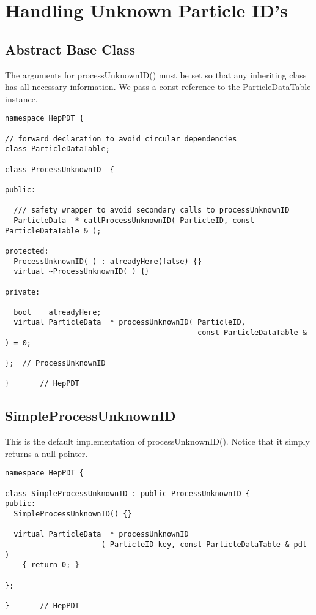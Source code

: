 \section { Handling Unknown Particle ID's }
\label{unknownID}

\subsection { Abstract Base Class }

The arguments for processUnknownID() must be set so that any
inheriting class has all necessary information. 
We pass a const reference to the ParticleDataTable instance.  

\begin{verbatim}
namespace HepPDT {

// forward declaration to avoid circular dependencies
class ParticleDataTable;

class ProcessUnknownID  {

public:

  /// safety wrapper to avoid secondary calls to processUnknownID
  ParticleData  * callProcessUnknownID( ParticleID, const ParticleDataTable & );

protected:
  ProcessUnknownID( ) : alreadyHere(false) {}
  virtual ~ProcessUnknownID( ) {}

private: 

  bool    alreadyHere;
  virtual ParticleData  * processUnknownID( ParticleID, 
                                            const ParticleDataTable & ) = 0;

};  // ProcessUnknownID

}       // HepPDT
\end{verbatim}


\subsection { SimpleProcessUnknownID }

This is the default implementation of processUnknownID().
Notice that it simply returns a null pointer.

\begin{verbatim}
namespace HepPDT {

class SimpleProcessUnknownID : public ProcessUnknownID {
public:
  SimpleProcessUnknownID() {}

  virtual ParticleData  * processUnknownID
                      ( ParticleID key, const ParticleDataTable & pdt )
    { return 0; }
    
};

}       // HepPDT
\end{verbatim}


